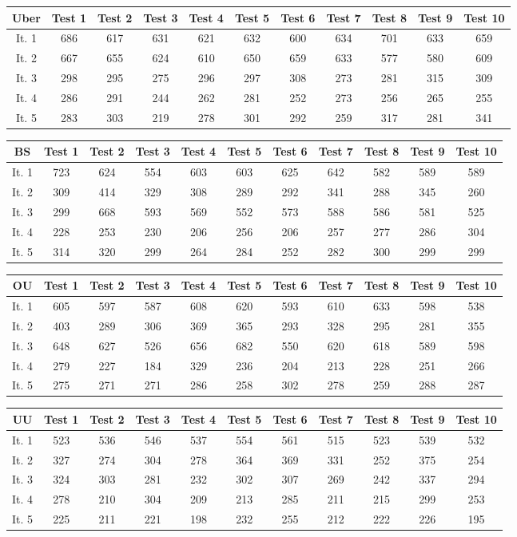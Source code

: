 \documentclass{article}
\begin{document}
\begin{figure}[H]
	\begin{tabular}{c||c|c|c|c|c|c|c|c|c|c}
		Uber&Test 1&Test 2&Test 3&Test 4&Test 5&Test 6&Test 7&Test 8&Test 9&Test 10\\
		\hline\hline
		It. 1&686&617&631&621&632&600&634&701&633&659\\
		It. 2&667&655&624&610&650&659&633&577&580&609\\
		It. 3&298&295&275&296&297&308&273&281&315&309\\
		It. 4&286&291&244&262&281&252&273&256&265&255\\
		It. 5&283&303&219&278&301&292&259&317&281&341\\
	\end{tabular}
	\centering
\end{figure}
\begin{figure}[H]
	\begin{tabular}{c||c|c|c|c|c|c|c|c|c|c}
		BS&Test 1&Test 2&Test 3&Test 4&Test 5&Test 6&Test 7&Test 8&Test 9&Test 10\\
		\hline\hline
		It. 1&723&624&554&603&603&625&642&582&589&589\\
		It. 2&309&414&329&308&289&292&341&288&345&260\\
		It. 3&299&668&593&569&552&573&588&586&581&525\\
		It. 4&228&253&230&206&256&206&257&277&286&304\\
		It. 5&314&320&299&264&284&252&282&300&299&299\\
	\end{tabular}
	\centering
\end{figure}
\begin{figure}[H]
	\begin{tabular}{c||c|c|c|c|c|c|c|c|c|c}
		OU&Test 1&Test 2&Test 3&Test 4&Test 5&Test 6&Test 7&Test 8&Test 9&Test 10\\
		\hline\hline
		It. 1&605&597&587&608&620&593&610&633&598&538\\
		It. 2&403&289&306&369&365&293&328&295&281&355\\
		It. 3&648&627&526&656&682&550&620&618&589&598\\
		It. 4&279&227&184&329&236&204&213&228&251&266\\
		It. 5&275&271&271&286&258&302&278&259&288&287\\
	\end{tabular}
	\centering
\end{figure}
\begin{figure}[H]
	\begin{tabular}{c||c|c|c|c|c|c|c|c|c|c}
		UU&Test 1&Test 2&Test 3&Test 4&Test 5&Test 6&Test 7&Test 8&Test 9&Test 10\\
		\hline\hline
		It. 1&523&536&546&537&554&561&515&523&539&532\\
		It. 2&327&274&304&278&364&369&331&252&375&254\\
		It. 3&324&303&281&232&302&307&269&242&337&294\\
		It. 4&278&210&304&209&213&285&211&215&299&253\\
		It. 5&225&211&221&198&232&255&212&222&226&195\\
	\end{tabular}
	\centering
\end{figure}
\end{document}
